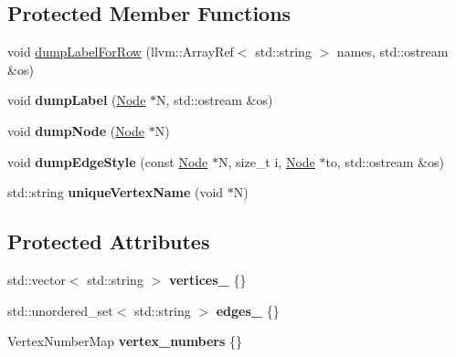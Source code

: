 \subsection*{Protected Member Functions}
\begin{DoxyCompactItemize}
\item 
void \hyperlink{class_abstract_dotty_printer_a16114210e14d5634d233f72872525611}{dump\+Label\+For\+Row} (llvm\+::\+Array\+Ref$<$ std\+::string $>$ names, std\+::ostream \&os)
\item 
\mbox{\label{class_abstract_dotty_printer_ab0999aeedafe421fd7093a56ee6e5810}} 
void {\bfseries dump\+Label} (\hyperlink{classglow_1_1_node}{Node} $\ast$N, std\+::ostream \&os)
\item 
\mbox{\label{class_abstract_dotty_printer_a172c8248d08fb2d56fc5ca963561a81b}} 
void {\bfseries dump\+Node} (\hyperlink{classglow_1_1_node}{Node} $\ast$N)
\item 
\mbox{\label{class_abstract_dotty_printer_a8f5fb2a0bae624879ce9a5712c5ba5c6}} 
void {\bfseries dump\+Edge\+Style} (const \hyperlink{classglow_1_1_node}{Node} $\ast$N, size\+\_\+t i, \hyperlink{classglow_1_1_node}{Node} $\ast$to, std\+::ostream \&os)
\item 
\mbox{\label{class_abstract_dotty_printer_abadee112b7d95c111e781f3961fd77de}} 
std\+::string {\bfseries unique\+Vertex\+Name} (void $\ast$N)
\end{DoxyCompactItemize}
\subsection*{Protected Attributes}
\begin{DoxyCompactItemize}
\item 
\mbox{\label{class_abstract_dotty_printer_acd9ebd3f910c6e80a664a61691b4486c}} 
std\+::vector$<$ std\+::string $>$ {\bfseries vertices\+\_\+} \{\}
\item 
\mbox{\label{class_abstract_dotty_printer_a48aab95e3f18a31384e38a67067f2b5d}} 
std\+::unordered\+\_\+set$<$ std\+::string $>$ {\bfseries edges\+\_\+} \{\}
\item 
\mbox{\label{class_abstract_dotty_printer_a858283a379ee6ee5445aecefdd4ff7d3}} 
Vertex\+Number\+Map {\bfseries vertex\+\_\+numbers} \{\}
\end{DoxyCompactItemize}


